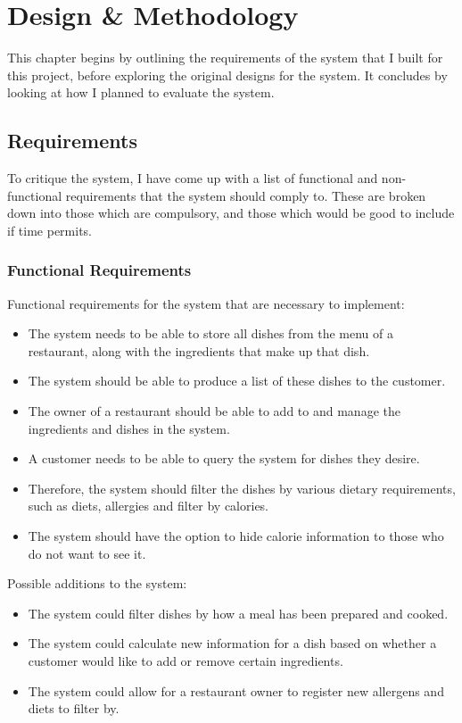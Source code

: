 \chapter{Design \& Methodology}

This chapter begins by outlining the requirements of the system that I built for this project, before exploring the original designs for the system. It concludes by looking at how I planned to evaluate the system.

\section{Requirements}
\label{section:SystemRequirements}

To critique the system, I have come up with a list of functional and non-functional requirements that the system should comply to. These are broken down into those which are compulsory, and those which would be good to include if time permits.

\subsection{Functional Requirements}
\label{section:FunctionalRequirements}

Functional requirements for the system that are necessary to implement:

\begin{itemize}
\item The system needs to be able to store all dishes from the menu of a restaurant, along with the ingredients that make up that dish.
\item The system should be able to produce a list of these dishes to the customer.
\item The owner of a restaurant should be able to add to and manage the ingredients and dishes in the system.
\item A customer needs to be able to query the system for dishes they desire.
\item Therefore, the system should filter the dishes by various dietary requirements, such as diets, allergies and filter by calories.
\item The system should have the option to hide calorie information to those who do not want to see it.
\end{itemize}

Possible additions to the system:

\begin{itemize}
\item The system could filter dishes by how a meal has been prepared and cooked.
\item The system could calculate new information for a dish based on whether a customer would like to add or remove certain ingredients.
\item The system could allow for a restaurant owner to register new allergens and diets to filter by.
\end{itemize}

